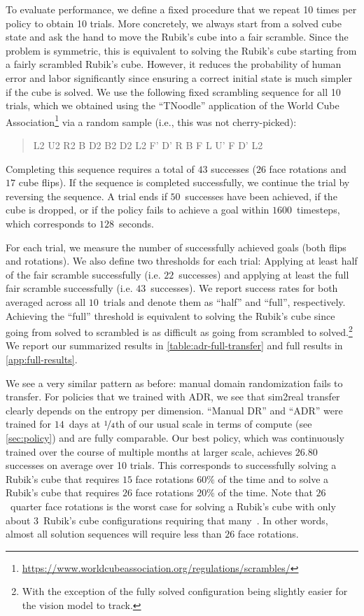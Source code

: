 To evaluate performance, we define a fixed procedure that we repeat 10 times per policy to obtain 10 trials. More concretely, we always start from a solved cube state and ask the hand to move the Rubik's cube into a fair scramble. Since the problem is symmetric, this is equivalent to solving the Rubik's cube starting from a fairly scrambled Rubik's cube. However, it reduces the probability of human error and labor significantly since ensuring a correct initial state is much simpler if the cube is solved. We use the following fixed scrambling sequence for all 10 trials, which we obtained using the ``TNoodle'' application of the World Cube Association\footnote{\url{https://www.worldcubeassociation.org/regulations/scrambles/}} via a random sample (i.e., this was not cherry-picked):
\begin{quote}
    L2 U2 R2 B D2 B2 D2 L2 F' D' R B F L U' F D' L2
\end{quote}
Completing this sequence requires a total of $43$ successes ($26$ face rotations and $17$ cube flips). If the sequence is completed successfully, we continue the trial by reversing the sequence. A trial ends if $50$~successes have been achieved, if the cube is dropped, or if the policy fails to achieve a goal within $1600$~timesteps, which corresponds to $128$~seconds.

For each trial, we measure the number of successfully achieved goals (both flips and rotations). We also define two thresholds for each trial: Applying at least half of the fair scramble successfully (i.e. $22$~successes) and applying at least the full fair scramble successfully (i.e. $43$~successes). We report success rates for both averaged across all $10$~trials and denote them as ``half'' and ``full'', respectively. Achieving the ``full'' threshold is equivalent to solving the Rubik's cube since going from solved to scrambled is as difficult as going from scrambled to solved.\footnote{With the exception of the fully solved configuration being slightly easier for the vision model to track.} We report our summarized results in \autoref{table:adr-full-transfer} and full results in \autoref{app:full-results}.

We see a very similar pattern as before: manual domain randomization fails to transfer. For policies that we trained with ADR, we see that sim2real transfer clearly depends on the entropy per dimension. ``Manual DR'' and ``ADR'' were trained for $14$~days at $\nicefrac{1}{4}$th of our usual scale in terms of compute (see \autoref{sec:policy}) and are fully comparable. Our best policy, which was continuously trained over the course of multiple months at larger scale, achieves $26.80$ successes on average over 10 trials. This corresponds to successfully solving a Rubik's cube that requires $15$ face rotations $60\%$ of the time and to solve a Rubik's cube that requires $26$ face rotations $20\%$ of the time. Note that $26$~quarter face rotations is the worst case for solving a Rubik's cube with only about $3$~Rubik's cube configurations requiring that many~\cite{qtm}. In other words, almost all solution sequences will require less than $26$ face rotations.


